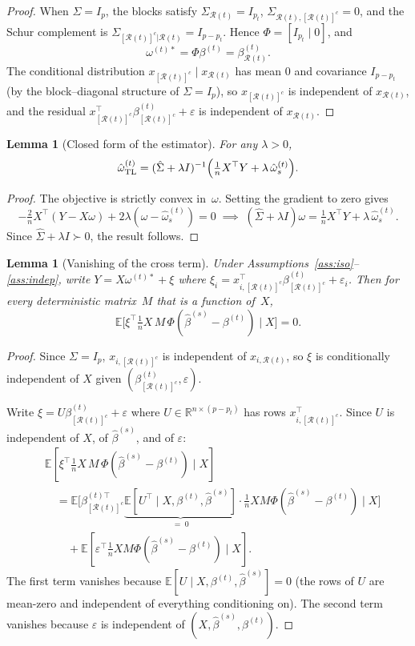 \documentclass[11pt,a4paper]{article}
\newtheorem{lemma}[theorem]{Lemma}
\theoremstyle{definition}
\newcommand{\R}{\mathbb{R}}
\newcommand{\E}{\mathbb{E}}
\newcommand{\cR}{\mathcal{R}}
\newcommand{\cRc}{[\cR(t)]^c}
\newcommand{\ohat}{\hat{\omega}_{\mathrm{TL}}^{(t)}}
\newcommand{\ostar}{\omega^{(t)*}}
\newcommand{\bhat}{\hat{\beta}^{(s)}}
\newcommand{\SigcR}{\Sigma_{\cRc|\cR(t)}}
\begin{document}
\begin{proof}
When $\Sigma=I_p$, the blocks satisfy
$\Sigma_{\cR(t)}=I_{p_t}$,
$\Sigma_{\cR(t),\cRc}=0$, and the Schur complement is
$\SigcR=I_{p-p_t}$.
Hence $\Phi=[I_{p_t}\mid 0]$, and
\[
  \ostar=\Phi\beta^{(t)}=\beta^{(t)}_{\cR(t)}.
\]
The conditional distribution
$x_{\cRc}\mid x_{\cR(t)}$ has mean $0$ and covariance $I_{p-p_t}$
(by the block--diagonal structure of $\Sigma=I_p$), so
$x_{\cRc}$ is independent of $x_{\cR(t)}$, and the residual
$x_{\cRc}^{\top}\beta^{(t)}_{\cRc}+\varepsilon$ is independent
of $x_{\cR(t)}$.
\end{proof}

\begin{lemma}[Closed form of the estimator]\label{lem:closedform}
For any $\lambda>0$,
\[
  \ohat
  =(\hat\Sigma+\lambda I)^{-1}
  \Bigl(\tfrac{1}{n}X^{\top}Y+\lambda\,\hat\omega_s^{(t)}\Bigr).
\]
\end{lemma}

\begin{proof}
The objective is strictly convex in~$\omega$.  Setting the gradient
to zero gives
\[
  -\tfrac{2}{n}X^{\top}(Y-X\omega)+2\lambda(\omega-\hat\omega_s^{(t)})=0
  \;\implies\;
  (\hat\Sigma+\lambda I)\omega=\tfrac{1}{n}X^{\top}Y+\lambda\,\hat\omega_s^{(t)}.
\]
Since $\hat\Sigma+\lambda I\succ 0$, the result follows.
\end{proof}

\begin{lemma}[Vanishing of the cross term]\label{lem:cross}
Under Assumptions~\ref{ass:iso}--\ref{ass:indep}, write
$Y=X\ostar+\xi$ where $\xi_i=x_{i,\cRc}^{\top}\beta^{(t)}_{\cRc}+\varepsilon_i$.
Then for every deterministic matrix~$M$ that is a function of~$X$,
\[
  \E\!\bigl[\xi^{\top}\tfrac{1}{n}X\,M\,\Phi(\bhat-\beta^{(t)})
  \;\big|\;X\bigr]=0.
\]
\end{lemma}

\begin{proof}
Since $\Sigma=I_p$, $x_{i,\cRc}$ is independent of $x_{i,\cR(t)}$,
so $\xi$ is conditionally independent of $X$ given
$(\beta^{(t)}_{\cRc},\varepsilon)$.

Write $\xi=U\beta^{(t)}_{\cRc}+\varepsilon$ where $U\in\R^{n\times(p-p_t)}$
has rows $x_{i,\cRc}^{\top}$.  Since $U$ is independent of $X$, of
$\bhat$, and of $\varepsilon$:
\begin{align*}
  &\E[\xi^{\top}\tfrac{1}{n}X\,M\,\Phi(\bhat-\beta^{(t)})\mid X] \\
  &\quad
  =\E\bigl[
    \beta^{(t)\top}_{\cRc}
    \underbrace{\E[U^{\top}\mid X,\beta^{(t)},\bhat]}_{=\;0}
    \cdot\tfrac{1}{n}XM\Phi(\bhat-\beta^{(t)})
    \;\big|\;X\bigr] \\
  &\qquad
  +\E[\varepsilon^{\top}\tfrac{1}{n}XM\Phi(\bhat-\beta^{(t)})\mid X].
\end{align*}
The first term vanishes because $\E[U\mid X,\beta^{(t)},\bhat]=0$
(the rows of $U$ are mean-zero and independent of everything
conditioning on).
The second term vanishes because $\varepsilon$ is independent of
$(X,\bhat,\beta^{(t)})$.
\end{proof}
\end{document}
